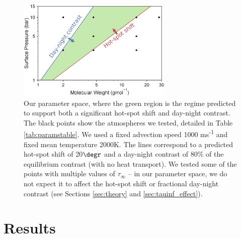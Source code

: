 \begin{figure}
  \centering
  \includegraphics[width=0.66\textwidth]{figures/linking-climate-55cnce/param_map_edited.eps}
\caption{Our parameter space, where the green region is the regime predicted to support both a significant hot-spot shift and day-night contrast. The black points show the atmospheres we tested, detailed in Table \ref{tab:paramstable}. We used a fixed advection speed 1000 ms\textsuperscript{-1} and fixed mean temperature 2000K. The lines correspond to a predicted hot-spot shift of 20$\degr$ and a day-night contrast of 80\% of the equilibrium contrast (with no heat transport). We tested some of the points with multiple values of $\tau_{\infty}$ -- in our parameter space, we do not expect it to affect the hot-spot shift or fractional day-night contrast (see Sections \ref{sec:theory} and \ref{sec:tauinf_effect}). \label{fig:param_map}}
\end{figure}






\section{Results}


